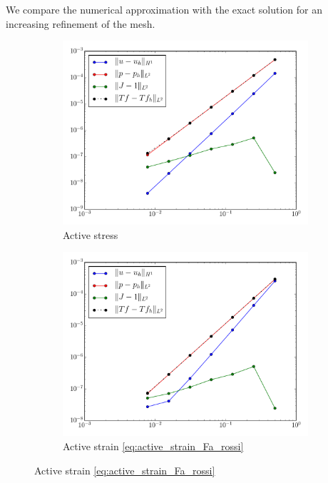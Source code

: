 \documentclass[a4paper,10pt]{article}
\begin{document}
We compare the numerical approximation with the exact solution for an increasing refinement of the mesh.

\begin{figure}[htbp]
\centering
\begin{subfigure}[t]{0.3\textwidth}
     \centering
     \includegraphics[width=\textwidth]{figures/mms2d_active_stress}
     \caption{\label{fig:mms2d_active_stress}Active stress}
\end{subfigure}
\begin{subfigure}[t]{0.3\textwidth}
    \includegraphics[width=\textwidth]{figures/mms2d_active_strain_rossi}
    \caption{\label{fig:mms2d_active_stain_rossi}Active strain \eqref{eq:active_strain_Fa_rossi} }    

\end{subfigure}
\end{figure}
\end{document}
